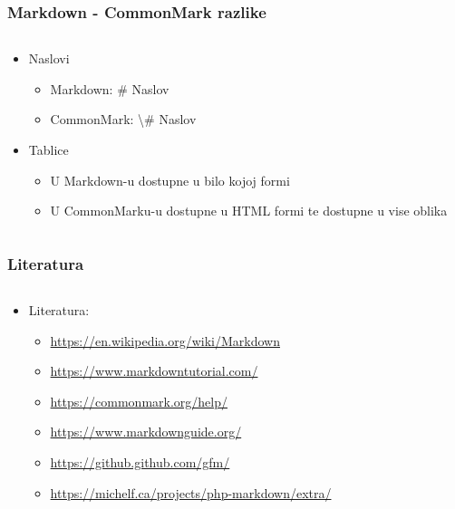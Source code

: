 \documentclass{beamer}
\begin{document}
\begin{frame}
	\frametitle{Markdown - CommonMark razlike}

 	\begin{minipage}[0.2\textheight]{\textwidth}
 	\begin{columns}[T]
 	\begin{column}{0.8\textwidth}
 	\begin{itemize}
 		\item{Naslovi
 		\begin{itemize}
 			\item{Markdown: \# Naslov}
 			\item{CommonMark: \textbackslash \# Naslov}
 		\end{itemize}}
 		\item{Tablice
 		\begin{itemize}
 			\item{U Markdown-u dostupne u bilo kojoj formi}
 			\item{U CommonMarku-u dostupne u HTML formi te dostupne u vise oblika}
 		\end{itemize}}
	\end{itemize}
	\end{column}
	\end{columns}
	\end{minipage}

\end{frame}

\begin{frame}
	\frametitle{Literatura}

 	\begin{minipage}[0.2\textheight]{\textwidth}
 	\begin{columns}[T]
 	\begin{column}{0.8\textwidth}
 	\begin{itemize}
 		\item{Literatura:
 		\begin{itemize}
 			\item{\url{https://en.wikipedia.org/wiki/Markdown}}
 			\item{\url{https://www.markdowntutorial.com/}}
 			\item{\url{https://commonmark.org/help/}}
 			\item{\url{https://www.markdownguide.org/}}
 			\item{\url{https://github.github.com/gfm/}}
 			\item{\url{https://michelf.ca/projects/php-markdown/extra/}}
 		\end{itemize}}
	\end{itemize}
	\end{column}
	\end{columns}
	\end{minipage}

\end{frame}
\end{document}
